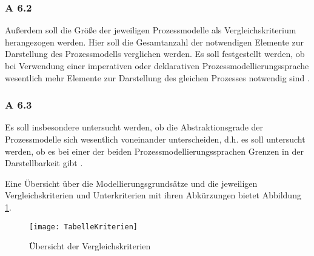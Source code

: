 \subsubsection{A 6.2}
Außerdem soll die Größe der jeweiligen Prozessmodelle als Vergleichskriterium herangezogen werden. Hier soll die Gesamtanzahl der notwendigen Elemente zur Darstellung des Prozessmodells verglichen werden. Es soll festgestellt werden, ob bei Verwendung einer imperativen oder deklarativen Prozessmodellierungssprache wesentlich mehr Elemente zur Darstellung des gleichen Prozesses notwendig sind \cite{leimeister2012, journals95, freund2007,reinshagen2009}.

 \subsubsection{A 6.3}
Es soll insbesondere untersucht werden, ob die Abstraktionsgrade der Prozessmodelle sich wesentlich voneinander unterscheiden, d.h. es soll untersucht werden, ob es bei einer der beiden Prozessmodellierungssprachen Grenzen in der Darstellbarkeit gibt \cite{leimeister2012, journals95, freund2007,reinshagen2009}.

Eine Übersicht über die Modellierungsgrundsätze und die jeweiligen Vergleichskriterien und Unterkriterien mit ihren Abkürzungen bietet Abbildung \ref{fig:TabelleKriterien}.

\begin{figure}[!htbp]
\begin{center}
  \texttt{[image: TabelleKriterien]} %
  \caption{Übersicht der Vergleichskriterien}
  \label{fig:TabelleKriterien}
\end{center}
\end{figure}









